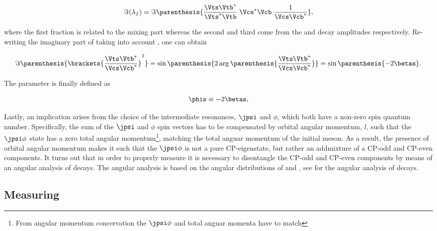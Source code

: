 \begin{equation}
  \centering
 \Im(\lambda_f) = \Im\parenthesis{ \frac{\Vts\Vtb^*}{\Vts^*\Vtb} \; \Vcs^*\Vcb \; \frac{1}{\Vcs\Vcb^*} },
 \label{lambdaf_ckm}
\end{equation}

\noindent where the first fraction is related to the mixing part \qoverp whereas the second and third come from the \Bsb and \Bs
decay amplitudes respectively. Re-writing the imaginary part of  taking into account ,
one can obtain 

\begin{equation}
  \centering
  \Im\parenthesis{ \brackets{ \frac{\Vts\Vtb^*}{\Vcs\Vcb^*}}^2 } =
  \sin \parenthesis{2 \arg \parenthesis{\frac{\Vts\Vtb^*}{\Vcs\Vcb^*}}} =
  \sin \parenthesis{-2\betas}.
 \label{lambda_ckm_manip}
\end{equation}

\noindent The parameter \phis is finally defined as

\begin{equation}
  \centering
  \phis\equiv-2\betas,
 \label{phis_def}
\end{equation}

\noindent Lastly, an implication arises from the choice of the intermediate resonances, $\jpsi$ and $\phi$,
which both have a non-zero spin quantum number. Specifically, the sum of the $\jpsi$ and $\phi$ spin vectors
has to be compensated by orbital angular momentum, $l$, such that the $\jpsi\phi$ state has a zero total angular momentum\footnote{
From angular momentum concervation the $\jpsi\phi$ and \Bs total anguar momenta have to match}, matching the
total anguar momentum of the initial \Bs meson. As a result, the presence of orbital angular momentum makes
it such that the $\jpsi\phi$ is not a pure CP-eigenstate, but rather an addmixture of a CP-odd and CP-even components.
It turns out that in order to properly measure \phis it is necessary to disentangle the CP-odd and CP-even
components by means of an angular analysis of \BsJpsiPhi decays. The angular analysis is based on the
angular distributions of \phiKK and \Jpsimumu, see  for the angular analysis
of \BsJpsiKst decays.

\subsection{Measuring \phis}
\label{measuring_phis}

